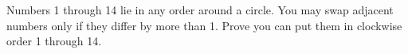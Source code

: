 Numbers 1 through 14 lie in any order around a circle. You may swap adjacent numbers only if they differ by more than 1. Prove you can put them in clockwise order 1 through 14.
